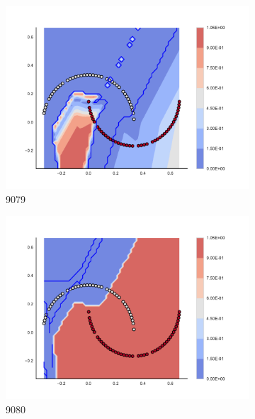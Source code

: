 \begin{figure}[h]
\begin{subfigure}[b]{0.09\textwidth}
    \includegraphics[clip, trim=2.35cm 1.75cm 4.5cm 0cm,width=\textwidth]{img/convergence/9079.pdf}
    \caption{9079}
    \label{fig:convergence_9079}
\end{subfigure}
%
\begin{subfigure}[b]{0.09\textwidth}
    \includegraphics[clip, trim=2.35cm 1.75cm 4.5cm 0cm,width=\textwidth]{img/convergence/9080.pdf}
    \caption{9080}
    \label{fig:convergence_9080}
\end{subfigure}
%
\begin{subfigure}[b]{0.09\textwidth}

\end{subfigure}
\end{figure}
